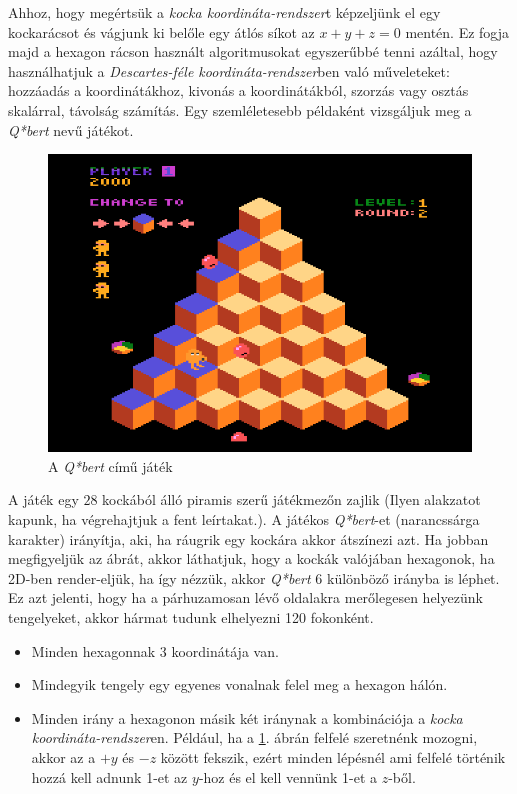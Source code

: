 \noindent Ahhoz, hogy megértsük a \textit{kocka koordináta-rendszer}t képzeljünk el egy kockarácsot és vágjunk ki belőle egy átlós síkot az $x + y + z = 0$ mentén. Ez fogja majd a hexagon rácson használt algoritmusokat egyszerűbbé tenni azáltal, hogy használhatjuk a \textit{Descartes-féle koordináta-rendszer}ben való műveleteket: hozzáadás a koordinátákhoz, kivonás a koordinátákból, szorzás vagy osztás skalárral, távolság számítás.
\newline
\newline Egy szemléletesebb példaként vizsgáljuk meg a \textit{Q*bert} nevű játékot.

\begin{figure}[h!]
\centering
\includegraphics[scale=0.3]{kepek/Qbert.png}
\caption{A \textit{Q*bert} című játék}
\label{fig:Qbert}
\end{figure}

\noindent A játék egy $28$ kockából álló piramis szerű játékmezőn zajlik (Ilyen alakzatot kapunk, ha végrehajtjuk a fent leírtakat.). A játékos \textit{Q*bert}-et (narancssárga karakter) irányítja, aki, ha ráugrik egy kockára akkor átszínezi azt.
\newline
\newline Ha jobban megfigyeljük az ábrát, akkor láthatjuk, hogy a kockák valójában hexagonok, ha 2D-ben render-eljük, ha így nézzük, akkor \textit{Q*bert} 6 különböző irányba is léphet. Ez azt jelenti, hogy ha a párhuzamosan lévő oldalakra merőlegesen helyezünk tengelyeket, akkor hármat tudunk elhelyezni 120 fokonként.

\begin{itemize}
\item Minden hexagonnak 3 koordinátája van. 
\item Mindegyik tengely egy egyenes vonalnak felel meg a hexagon hálón.
\item Minden irány a hexagonon másik két iránynak a kombinációja a \textit{kocka koordináta-rendszer}en. Például, ha a \ref{fig:Qbert}. ábrán felfelé szeretnénk mozogni, akkor az a $+y$ és $-z$ között fekszik, ezért minden lépésnél ami felfelé történik hozzá kell adnunk 1-et az $y$-hoz és el kell vennünk 1-et a $z$-ből. 
\end{itemize}

